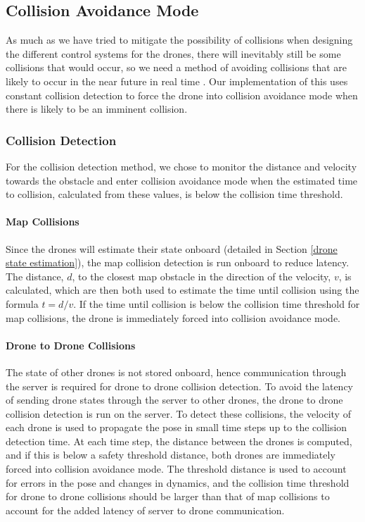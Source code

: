 \documentclass{report_template_oxford}
\begin{document}
\subsection{Collision Avoidance Mode} \label{collision avoidance mode} %

As much as we have tried to mitigate the possibility of collisions when designing the different control systems for the drones, there will inevitably still be some collisions that would occur, so we need a method of avoiding collisions that are likely to occur in the near future in real time . Our implementation of this uses constant collision detection to force the drone into collision avoidance mode when there is likely to be an imminent collision. 

\subsubsection{Collision Detection}
For the collision detection method, we chose to monitor the distance and velocity towards the obstacle and enter collision avoidance mode when the estimated time to collision, calculated from these values, is below the collision time threshold.

\paragraph{Map Collisions} Since the drones will estimate their state onboard (detailed in Section \ref{drone state estimation}), the map collision detection is run onboard to reduce latency. The distance, $d$, to the closest map obstacle in the direction of the velocity, $v$, is calculated, which are then both used to estimate the time until collision using the formula $t=d/v$. If the time until collision is below the collision time threshold for map collisions, the drone is immediately forced into collision avoidance mode.

\paragraph{Drone to Drone Collisions} The state of other drones is not stored onboard, hence communication through the server is required for drone to drone collision detection. To avoid the latency of sending drone states through the server to other drones, the drone to drone collision detection is run on the server. To detect these collisions, the velocity of each drone is used to propagate the pose in small time steps up to the collision detection time. At each time step, the distance between the drones is computed, and if this is below a safety threshold distance, both drones are immediately forced into collision avoidance mode. The threshold distance is used to account for errors in the pose and changes in dynamics, and the collision time threshold for drone to drone collisions should be larger than that of map collisions to account for the added latency of server to drone communication.
\end{document}
